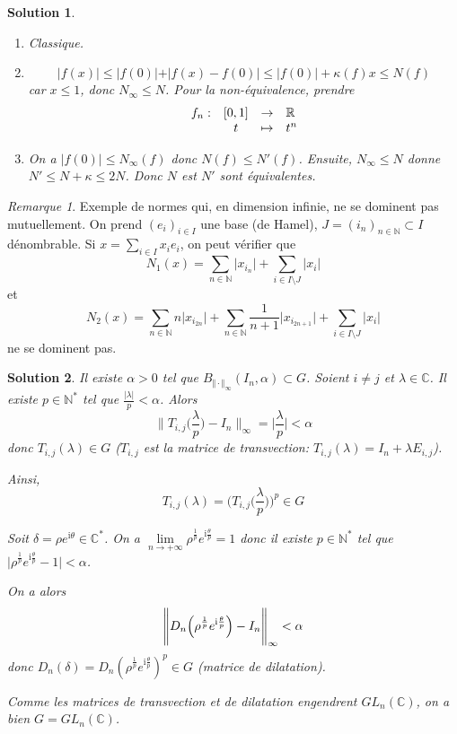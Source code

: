 \documentclass[12pt]{article}
\newtheorem{solution}{Solution}[section]
\theoremstyle{remark}
\newtheorem{remark}{Remarque}[section]
\newcommand{\C}{\mathbb{C}} \newcommand{\Q}{\mathbb{Q}}
\newcommand{\N}{\mathbb{N}} \newcommand{\Z}{\mathbb{Z}}
\newcommand{\function}[5]{
	$$
	\begin{array}{rccl}
		#1: & #2 & \to & #3 \\
		& #4 & \mapsto & #5
	\end{array}
	$$
}
\begin{document}
\begin{solution}
	\phantom{}
	\begin{enumerate}
		\item Classique.
		\item $$\vert f(x)\vert\leqslant\vert f(0)\vert+\vert f(x)-f(0)\vert\leqslant\vert f(0)\vert+\kappa(f)x\leqslant N(f)$$
		car $x\leqslant 1$, donc $N_{\infty}\leqslant N$. Pour la non-équivalence, prendre \function{f_n}{[0,1]}{\R}{t}{t^n}
		\item On a $\vert f(0)\vert\leqslant N_{\infty}(f)$ donc $N(f)\leqslant N'(f)$. Ensuite, $N_{\infty}\leqslant N$ donne $N'\leqslant N+\kappa\leqslant 2N$. Donc $N$ est $N'$ sont équivalentes.
	\end{enumerate}
\end{solution}

\begin{remark}
	Exemple de normes qui, en dimension infinie, ne se dominent pas mutuellement. On prend $(e_{i})_{i\in I}$ une base (de Hamel), $J=(i_{n})_{n\in\N}\subset I$ dénombrable. Si $x=\sum_{i\in I}x_{i}e_{i}$, on peut vérifier que 
	$$N_{1}(x)=\sum_{n\in\N}\vert x_{i_{n}}\vert+\sum_{i\in I\setminus J}\vert x_{i}\vert$$
	et
	$$N_{2}(x)=\sum_{n\in\N}n\vert x_{i_{2n}}\vert+\sum_{n\in\N}\frac{1}{n+1}\bigl\lvert x_{i_{2n+1}}\bigr\rvert+\sum_{i\in I\setminus J}\vert x_{i}\vert$$
	ne se dominent pas.
\end{remark}

\begin{solution}
	Il existe $\alpha>0$ tel que $B_{\Vert\cdot\Vert_{\infty}}(I_{n},\alpha)\subset G$. Soient $i\neq j$ et $\lambda\in\C$. Il existe $p\in\N^{*}$ tel que $\frac{\vert\lambda\vert}{p}<\alpha$. Alors 
	$$\Biggl\lVert T_{i,j}\Biggl(\frac{\lambda}{p}\Biggr)-I_{n}\Biggr\rVert_{\infty}=\Biggl\lvert\frac{\lambda}{p}\Biggr\rvert<\alpha$$
	donc $T_{i,j}(\lambda)\in G$ ($T_{i,j}$ est la matrice de transvection: $T_{i,j}(\lambda)=I_{n}+\lambda E_{i,j}$).

	Ainsi,
	$$T_{i,j}(\lambda)=\Biggl(T_{i,j}\Biggl(\frac{\lambda}{p}\Biggr)\Biggr)^{p}\in G$$

	Soit $\delta=\rho e^{\mathrm{i}\theta}\in\C^{*}$. On a $\lim\limits_{n\to+\infty}\rho^{\frac{1}{p}}e^{\mathrm{i}\frac{\theta}{p}}=1$ donc il existe $p\in\N^{*}$ tel que $\vert\rho^{\frac{1}{p}}e^{\mathrm{i}\frac{\theta}{p}}-1\vert<\alpha$.
	
	On a alors
	$$\Biggl\lVert D_{n}\Bigl(\rho^{\frac{1}{p}}e^{\mathrm{i}\frac{\theta}{p}}\Bigr)-I_{n}\Biggr\rVert_{\infty}<\alpha$$
	donc $D_{n}(\delta)=D_{n}(\rho^{\frac{1}{p}}e^{\mathrm{i}\frac{\theta}{p}})^{p}\in G$ (matrice de dilatation).

	Comme les matrices de transvection et de dilatation engendrent $GL_{n}(\C)$, on a bien $G=GL_{n}(\C)$.
\end{solution}
\end{document}
